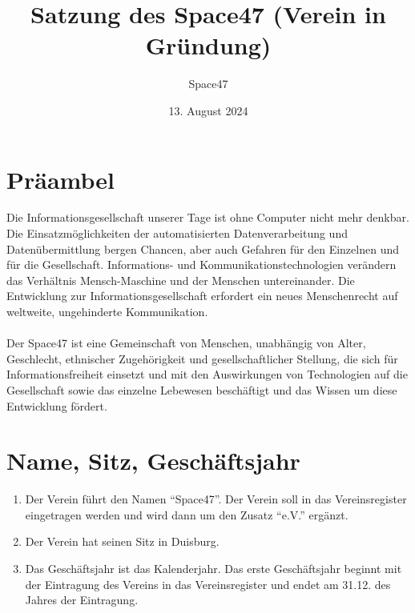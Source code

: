 \documentclass[a4paper]{article}
\title{Satzung des Space47 (Verein in Gründung)}
\author{Space47}
\date{13. August 2024}
\renewcommand\thesection{§ \arabic{section}}
\begin{document}
\maketitle


\renewcommand\thesection{}
\section{Präambel}

Die Informationsgesellschaft unserer Tage ist ohne Computer nicht mehr denkbar.
Die Einsatzmöglichkeiten der automatisierten Datenverarbeitung und Datenübermittlung bergen Chancen,
aber auch Gefahren für den Einzelnen und für die Gesellschaft.
Informations- und Kommunikationstechnologien verändern das Verhältnis Mensch-Maschine und der Menschen untereinander.
Die Entwicklung zur Informationsgesellschaft erfordert ein neues Menschenrecht auf weltweite, ungehinderte Kommunikation. \\ \\
Der Space47 ist eine Gemeinschaft von Menschen, unabhängig von Alter, Geschlecht, ethnischer Zugehörigkeit und
gesellschaftlicher Stellung, die sich für Informationsfreiheit einsetzt und mit den Auswirkungen von Technologien
auf die Gesellschaft sowie das einzelne Lebewesen beschäftigt und das Wissen um diese Entwicklung fördert.

\renewcommand\thesection{§ \arabic{section}}
\setcounter{section}{0}
\section{Name, Sitz, Geschäftsjahr}
\begin{enumerate}
	\item Der Verein führt den Namen \enquote{Space47}. Der Verein soll in das Vereinsregister eingetragen werden und wird dann um den Zusatz \enquote{e.V.} ergänzt.
	\item Der Verein hat seinen Sitz in Duisburg.
	\item Das Geschäftsjahr ist das Kalenderjahr. Das erste Geschäftsjahr beginnt mit der Eintragung des Vereins in das Vereinsregister und endet am 31.12. des Jahres der Eintragung.
\end{enumerate}
\end{document}
